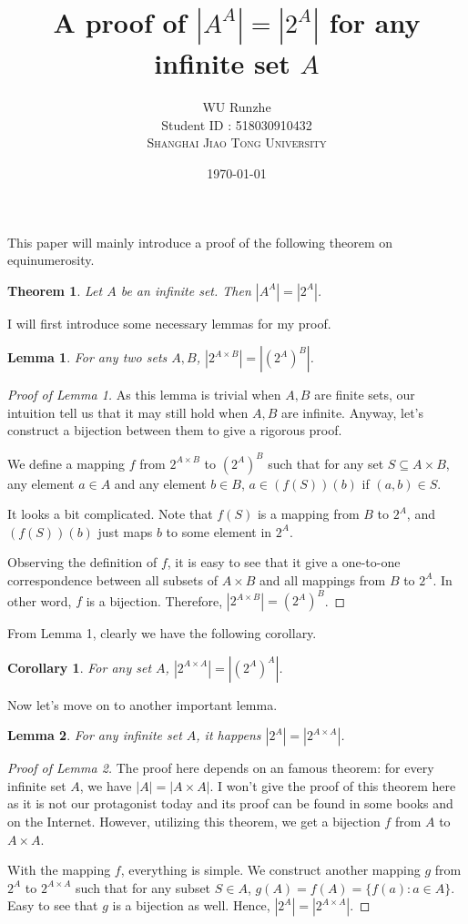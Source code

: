 \documentclass{article}
\title{A proof of $|A^A|=|2^A|$ for any infinite set $A$}
\author{WU Runzhe\\
	Student ID : 518030910432\\
	\textsc{Shanghai Jiao Tong University}}
\date{\today}
\newtheorem{lemma}{Lemma}
\newtheorem{theorem}{Theorem}
\newtheorem{corollary}{Corollary}
\begin{document}
\maketitle

This paper will mainly introduce a proof of the following theorem on equinumerosity.

\begin{theorem}
	Let $A$ be an infinite set. Then $|A^A|=|2^A|$.
\end{theorem}

I will first introduce some necessary lemmas for my proof. 

\begin{lemma}
	For any two sets $A, B$, $|2^{A\times B}|=|(2^A)^B|$.
\end{lemma}

\begin{proof}[Proof of Lemma 1]
	As this lemma is trivial when $A,B$ are finite sets, our intuition tell us that it may still hold when $A,B$ are infinite. Anyway, let's construct a bijection between them to give a rigorous proof.

	We define a mapping $f$ from $2^{A\times B}$ to $(2^A)^B$ such that for any set $S\subseteq A\times B$, any element $a\in A$ and any element $b\in B$, $a\in(f(S))(b)$ if $(a,b)\in S$. 
	
	It looks a bit complicated. Note that $f(S)$ is a mapping from $B$ to $2^A$, and $(f(S))(b)$ just maps $b$ to some element in $2^A$.
	
	Observing the definition of $f$, it is easy to see that it give a one-to-one correspondence between all subsets of $A\times B$ and all mappings from $B$ to $2^A$. In other word, $f$ is a bijection. Therefore, $|2^{A\times B}|=(2^A)^B$.
	
\end{proof}

From Lemma 1, clearly we have the following corollary.

\begin{corollary}
	For any set $A$, $|2^{A\times A}|=|(2^A)^A|$.
\end{corollary}

Now let's move on to another important lemma.

\begin{lemma}
	For any infinite set $A$, it happens $|2^A|=|2^{A\times A}|$.
\end{lemma}

\begin{proof}[Proof of Lemma 2]
	
	The proof here depends on an famous theorem: for every infinite set $A$, we have $|A|=|A\times A|$. I won't give the proof of this theorem here as it is not our protagonist today and its proof can be found in some books and on the Internet. However, utilizing this theorem, we get a bijection $f$ from $A$ to $A\times A$.
	
	With the mapping $f$, everything is simple. We construct another mapping $g$ from $2^A$ to $2^{A\times A}$ such that for any subset $S\in A$, $g(A)=f(A)=\{f(a):a\in A\}$. Easy to see that $g$ is a bijection as well. Hence, $|2^A|=|2^{A\times A}|$.
	
\end{proof}
\end{document}
